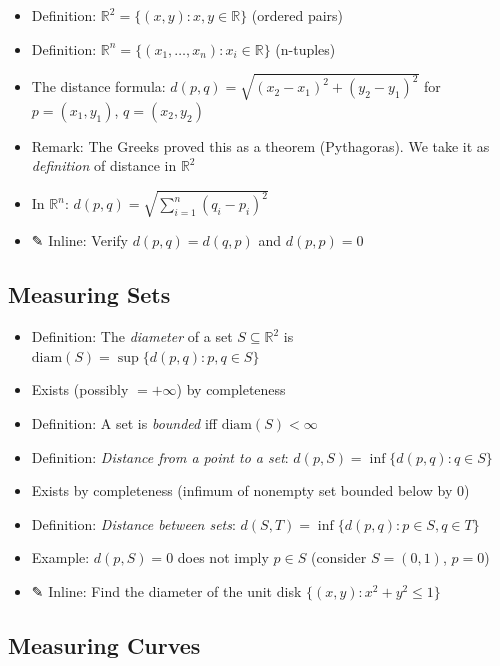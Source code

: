 \documentclass[
  10pt,
  letterpaper,
]{scrbook}
\providecommand{\tightlist}{%
  \setlength{\itemsep}{0pt}\setlength{\parskip}{0pt}}
\begin{document}
\begin{itemize}
\tightlist
\item
  Definition: \(\mathbb{R}^2 = \{(x, y) : x, y \in \mathbb{R}\}\)
  (ordered pairs)
\item
  Definition:
  \(\mathbb{R}^n = \{(x_1, \ldots, x_n) : x_i \in \mathbb{R}\}\)
  (n-tuples)
\item
  The distance formula:
  \(d(p, q) = \sqrt{(x_2 - x_1)^2 + (y_2 - y_1)^2}\) for
  \(p = (x_1, y_1)\), \(q = (x_2, y_2)\)
\item
  Remark: The Greeks proved this as a theorem (Pythagoras). We take it
  as \emph{definition} of distance in \(\mathbb{R}^2\)
\item
  In \(\mathbb{R}^n\): \(d(p, q) = \sqrt{\sum_{i=1}^{n}(q_i - p_i)^2}\)
\item
  ✎ Inline: Verify \(d(p, q) = d(q, p)\) and \(d(p, p) = 0\)
\end{itemize}

\subsection{Measuring Sets}\label{measuring-sets}

\begin{itemize}
\tightlist
\item
  Definition: The \emph{diameter} of a set \(S \subseteq \mathbb{R}^2\)
  is \(\text{diam}(S) = \sup\{d(p, q) : p, q \in S\}\)
\item
  Exists (possibly \(= +\infty\)) by completeness
\item
  Definition: A set is \emph{bounded} iff \(\text{diam}(S) < \infty\)
\item
  Definition: \emph{Distance from a point to a set}:
  \(d(p, S) = \inf\{d(p, q) : q \in S\}\)
\item
  Exists by completeness (infimum of nonempty set bounded below by 0)
\item
  Definition: \emph{Distance between sets}:
  \(d(S, T) = \inf\{d(p, q) : p \in S, q \in T\}\)
\item
  Example: \(d(p, S) = 0\) does not imply \(p \in S\) (consider
  \(S = (0, 1)\), \(p = 0\))
\item
  ✎ Inline: Find the diameter of the unit disk
  \(\{(x,y) : x^2 + y^2 \leq 1\}\)
\end{itemize}

\subsection{Measuring Curves}\label{measuring-curves}
\end{document}
